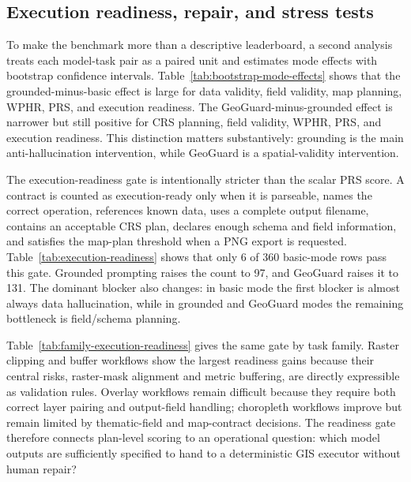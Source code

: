 \documentclass[12pt]{gsis}  %
\begin{document}
\subsection{Execution readiness, repair, and stress tests}

To make the benchmark more than a descriptive leaderboard, a second analysis treats each model-task pair as a paired unit and estimates mode effects with bootstrap confidence intervals. Table~\ref{tab:bootstrap-mode-effects} shows that the grounded-minus-basic effect is large for data validity, field validity, map planning, WPHR, PRS, and execution readiness. The GeoGuard-minus-grounded effect is narrower but still positive for CRS planning, field validity, WPHR, PRS, and execution readiness. This distinction matters substantively: grounding is the main anti-hallucination intervention, while GeoGuard is a spatial-validity intervention.



The execution-readiness gate is intentionally stricter than the scalar PRS score. A contract is counted as execution-ready only when it is parseable, names the correct operation, references known data, uses a complete output filename, contains an acceptable CRS plan, declares enough schema and field information, and satisfies the map-plan threshold when a PNG export is requested. Table~\ref{tab:execution-readiness} shows that only 6 of 360 basic-mode rows pass this gate. Grounded prompting raises the count to 97, and GeoGuard raises it to 131. The dominant blocker also changes: in basic mode the first blocker is almost always data hallucination, while in grounded and GeoGuard modes the remaining bottleneck is field/schema planning.



Table~\ref{tab:family-execution-readiness} gives the same gate by task family. Raster clipping and buffer workflows show the largest readiness gains because their central risks, raster-mask alignment and metric buffering, are directly expressible as validation rules. Overlay workflows remain difficult because they require both correct layer pairing and output-field handling; choropleth workflows improve but remain limited by thematic-field and map-contract decisions. The readiness gate therefore connects plan-level scoring to an operational question: which model outputs are sufficiently specified to hand to a deterministic GIS executor without human repair?
\end{document}
